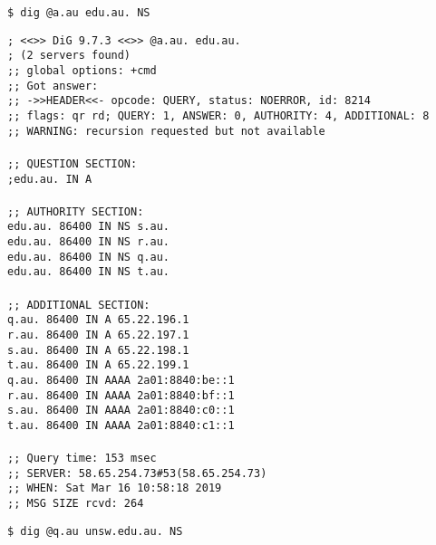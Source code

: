\documentclass[a4paper,11pt]{article}
\newcommand{\code}{\texttt}
\begin{document}
\begin{enumerate}[leftmargin=*]
	\code{\$ dig @a.au edu.au. NS}
	
	\code{; <<>> DiG 9.7.3 <<>> @a.au. edu.au.\\
	; (2 servers found)\\
	;; global options: +cmd\\
	;; Got answer:\\
	;; ->>HEADER<<- opcode: QUERY, status: NOERROR, id: 8214\\
	;; flags: qr rd; QUERY: 1, ANSWER: 0, AUTHORITY: 4, ADDITIONAL: 8\\
	;; WARNING: recursion requested but not available\\
	\\
	;; QUESTION SECTION:\\
	;edu.au.				IN	A\\
	\\
	;; AUTHORITY SECTION:\\
	edu.au.			86400	IN	NS	s.au.\\
	edu.au.			86400	IN	NS	r.au.\\
	edu.au.			86400	IN	NS	q.au.\\
	edu.au.			86400	IN	NS	t.au.\\
	\\
	;; ADDITIONAL SECTION:\\
	q.au.			86400	IN	A	65.22.196.1\\
	r.au.			86400	IN	A	65.22.197.1\\
	s.au.			86400	IN	A	65.22.198.1\\
	t.au.			86400	IN	A	65.22.199.1\\
	q.au.			86400	IN	AAAA	2a01:8840:be::1\\
	r.au.			86400	IN	AAAA	2a01:8840:bf::1\\
	s.au.			86400	IN	AAAA	2a01:8840:c0::1\\
	t.au.			86400	IN	AAAA	2a01:8840:c1::1\\
	\\
	;; Query time: 153 msec\\
	;; SERVER: 58.65.254.73\#53(58.65.254.73)\\
	;; WHEN: Sat Mar 16 10:58:18 2019\\
	;; MSG SIZE  rcvd: 264\\}

	\code{\$ dig @q.au unsw.edu.au. NS}


\end{enumerate}
\end{document}
